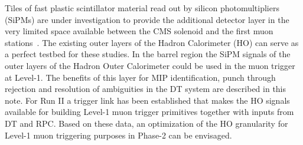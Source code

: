 Tiles of fast plastic scintillator material read out by silicon photomultipliers (SiPMs) are under investigation to provide the additional detector layer in the very limited space available 
between the CMS solenoid and the first muon stations~\cite{dn2014-020}. The existing outer layers of the Hadron Calorimeter (HO)  can serve as a perfect testbed for these studies. In the barrel region the 
SiPM signals of the outer layers of the Hadron Outer Calorimeter could be used in the muon trigger at Level-1. The benefits of this layer for MIP identification, punch through rejection 
and resolution of ambiguities in the DT system are described in this note. For Run II a trigger link has been established that makes the HO signals available for building Level-1 muon 
trigger primitives together with inputs from DT and RPC. Based on these data, an optimization of the HO granularity for Level-1 muon triggering purposes in Phase-2 can be envisaged. 

